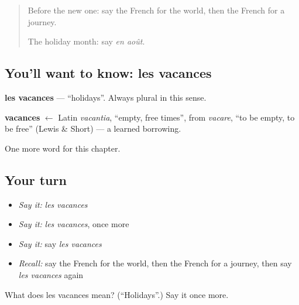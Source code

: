 \begin{quote}
Before the new one: say the French for the world, then the French for a journey.

The holiday month: say \emph{en août}.
\end{quote}

\subsection*{You'll want to know: les vacances}
\textbf{les vacances} — \textquotedblleft{}holidays\textquotedblright{}. Always plural in this sense.

\begin{cousinweb}
\textbf{vacances} $\leftarrow$ Latin \emph{vacantia}, \textquotedblleft{}empty, free times\textquotedblright{}, from \emph{vacare}, \textquotedblleft{}to be empty, to be free\textquotedblright{} (Lewis \& Short) — a learned borrowing.
\end{cousinweb}

\begin{grammarlens}[title={What you've built}]
One more word for this chapter.
\end{grammarlens}

\subsection*{Your turn}
\begin{itemize}
\raggedright
  \item \emph{Say it:} \emph{les vacances}
  \item \emph{Say it:} \emph{les vacances}, once more
  \item \emph{Say it:} say \emph{les vacances}
  \item \emph{Recall:} say the French for the world, then the French for a journey, then say \emph{les vacances} again
\end{itemize}

\begin{tcolorbox}[breakable,colback=teal!4,colframe=teal!35!black,title={Before you move on}]
What does les vacances mean? (\textquotedblleft{}Holidays\textquotedblright{}.) Say it once more.
\end{tcolorbox}
